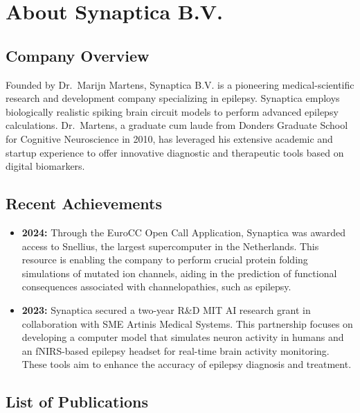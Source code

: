 \section*{About Synaptica B.V.}

\subsection*{Company Overview}

Founded by Dr.\ Marijn Martens, Synaptica B.V. is a pioneering medical-scientific research and development company specializing in epilepsy.
Synaptica employs biologically realistic spiking brain circuit models to perform advanced epilepsy calculations.
Dr.\ Martens, a graduate cum laude from Donders Graduate School for Cognitive Neuroscience in 2010, has leveraged his
extensive academic and startup experience to offer innovative diagnostic and therapeutic tools based on digital biomarkers.

\subsection*{Recent Achievements}

\begin{itemize}
    \item \textbf{2024:} Through the EuroCC Open Call Application, Synaptica was awarded access to Snellius,
          the largest supercomputer in the Netherlands. This resource is enabling the company to perform crucial protein
          folding simulations of mutated ion channels, aiding in the prediction of functional consequences associated with channelopathies, such as epilepsy.

    \item \textbf{2023:} Synaptica secured a two-year R\&D MIT AI research grant in collaboration with SME Artinis Medical Systems.
          This partnership focuses on developing a computer model that simulates neuron activity in humans and an fNIRS-based epilepsy headset
          for real-time brain activity monitoring. These tools aim to enhance the accuracy of epilepsy diagnosis and treatment.
\end{itemize}

\subsection*{List of Publications}


